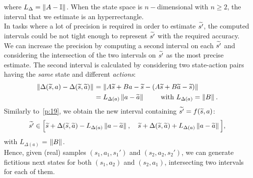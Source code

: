 where $L_{\Delta} = \left\|A - \mathbb{I}\right\|_{}$.
When the state space is $n-$dimensional with $n\geq 2$, the interval that we estimate is an hyperrectangle.\\
\newline
In tasks where a lot of precision is required in order to estimate $\widetilde{s'}$, the computed intervals could be not tight enough to represent $\widetilde{s'}$ with the required accuracy. We can increase the precision by computing a second interval on each $\widetilde{s'}$ and considering the intersection of the two intervals on $\widetilde{s'}$ as the most precise estimate. The second interval is calculated by considering two state-action pairs having the \emph{same} state and different \emph{actions}:
\begin{align}
\left\|\Delta(\widetilde{s},a) - \Delta(\widetilde{s}, \widetilde{a})\right\|_{} &= \left\|A\widetilde{s}+Ba-\widetilde{s} - \left(A\widetilde{s}+B\widetilde{a}-\widetilde{s}\right)\right\|_{} \nonumber \\
&= L_{\Delta(a)} \left\|a-\widetilde{a}\right\|_{} \qquad \text{ with } L_{\Delta(a)}=\left\|B\right\|_{}. \label{p:21}
\end{align}
Similarly to~\eqref{p:19}, we obtain the new interval containing $\widetilde{s'} = f(\widetilde{s}, a)$:
\begin{align}
\widetilde{s'} \in \Big[\widetilde{s} + \Delta(\widetilde{s},\widetilde{a}) - L_{\Delta (a)}\left\|a - \widetilde{a}\right\|_{}, \quad \widetilde{s} + \Delta(\widetilde{s},\widetilde{a}) + L_{\Delta (a)}\left\|a - \widetilde{a}\right\|_{} \Big],\label{p:25}
\end{align}
with $L_{\Delta (a)}$ = $\left\|B\right\|_{}$.\\
\newline
Hence, given (real) samples $(s_1,a_1,s_1')$ and $(s_2, a_2, s_2')$, we can generate fictitious next states for both $(s_1,a_2)$ and $(s_2,a_1)$, intersecting two intervals for each of them.

